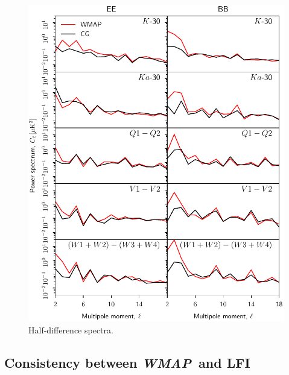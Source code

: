 \documentclass[twocolumn]{../../common/aa}
\def\WMAP{\emph{WMAP}}
\begin{document}
\begin{figure}
	\centering
	\includegraphics[width=\linewidth]{figures/cls_cg_WMAP_lowl.pdf}
	\caption{Half-difference spectra.}
        \label{fig:cl_halfdiff}
\end{figure}



\subsection{Consistency between \WMAP\ and LFI}
\label{sec:lfi_consistency}
\end{document}
